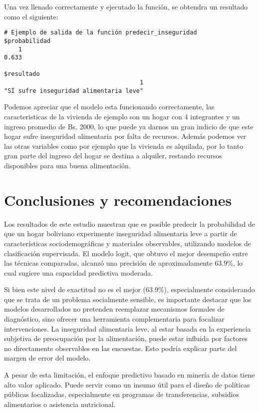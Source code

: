 \documentclass[Royal,times,sageh]{sagej}
\begin{document}
Una vez llenado correctamente y ejecutado la función, se obtendra un
resultado como el siguiente:

\begin{verbatim}
# Ejemplo de salida de la función predecir_inseguridad
$probabilidad
    1 
0.633 

$resultado
                                      1 
"SÍ sufre inseguridad alimentaria leve" 
\end{verbatim}

Podemos apreciar que el modelo esta funcionando correctamente, las
caracteristicas de la vivienda de ejemplo son un hogar con 4 integrantes
y un ingreso promedio de Bs. 2000, lo que puede ya darnos un gran
indicio de que este hogar sufre inseguridad alimentaria por falta de
recursos. Además podemos ver las otras variables como por ejemplo que la
vivienda es alquilada, por lo tanto gran parte del ingreso del hogar se
destina a alquiler, restando recursos disponibles para una buena
alimentación.

\section{Conclusiones y
recomendaciones}\label{conclusiones-y-recomendaciones}

Los resultados de este estudio muestran que es posible predecir la
probabilidad de que un hogar boliviano experimente inseguridad
alimentaria leve a partir de características sociodemográficas y
materiales observables, utilizando modelos de clasificación supervisada.
El modelo logit, que obtuvo el mejor desempeño entre las técnicas
comparadas, alcanzó una precisión de aproximadamente 63.9\%, lo cual
sugiere una capacidad predictiva moderada.

Si bien este nivel de exactitud no es el mejor (63.9\%), especialmente
considerando que se trata de un problema socialmente sensible, es
importante destacar que los modelos desarrollados no pretenden
reemplazar mecanismos formales de diagnóstico, sino ofrecer una
herramienta complementaria para focalizar intervenciones. La inseguridad
alimentaria leve, al estar basada en la experiencia subjetiva de
preocupación por la alimentación, puede estar influida por factores no
directamente observables en las encuestas. Esto podría explicar parte
del margen de error del modelo.

A pesar de esta limitación, el enfoque predictivo basado en minería de
datos tiene alto valor aplicado. Puede servir como un insumo útil para
el diseño de políticas públicas focalizadas, especialmente en programas
de transferencias, subsidios alimentarios o asistencia nutricional.
\end{document}
